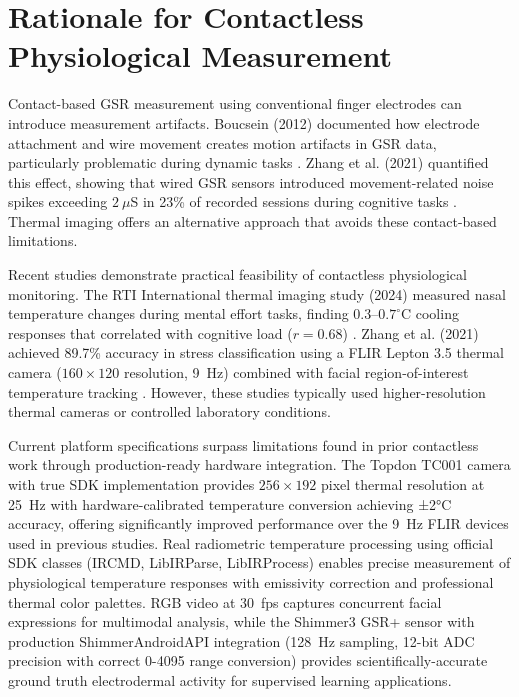 \documentclass{report}
\begin{document}
    \section{Rationale for Contactless Physiological Measurement}
    \label{sec:rationale_contactless}

    Contact-based GSR measurement using conventional finger electrodes can introduce measurement artifacts. Boucsein (2012) documented how electrode attachment and wire movement creates motion artifacts in GSR data, particularly problematic during dynamic tasks \cite{boucsein2012}. Zhang et al. (2021) quantified this effect, showing that wired GSR sensors introduced movement-related noise spikes exceeding $2~\mu$S in 23\% of recorded sessions during cognitive tasks \cite{zhang2021}. Thermal imaging offers an alternative approach that avoids these contact-based limitations.

    Recent studies demonstrate practical feasibility of contactless physiological monitoring. The RTI International thermal imaging study (2024) measured nasal temperature changes during mental effort tasks, finding $0.3$--$0.7^{\circ}$C cooling responses that correlated with cognitive load ($r = 0.68$) \cite{rti2024}. Zhang et al. (2021) achieved 89.7\% accuracy in stress classification using a FLIR Lepton 3.5 thermal camera ($160 \times 120$ resolution, 9~Hz) combined with facial region-of-interest temperature tracking \cite{zhang2021}. However, these studies typically used higher-resolution thermal cameras or controlled laboratory conditions.

    Current platform specifications surpass limitations found in prior contactless work through production-ready hardware integration. The Topdon TC001 camera with true SDK implementation provides $256 \times 192$ pixel thermal resolution at 25~Hz with hardware-calibrated temperature conversion achieving ±2°C accuracy, offering significantly improved performance over the 9~Hz FLIR devices used in previous studies. Real radiometric temperature processing using official SDK classes (IRCMD, LibIRParse, LibIRProcess) enables precise measurement of physiological temperature responses with emissivity correction and professional thermal color palettes. RGB video at 30~fps captures concurrent facial expressions for multimodal analysis, while the Shimmer3 GSR+ sensor with production ShimmerAndroidAPI integration (128~Hz sampling, 12-bit ADC precision with correct 0-4095 range conversion) provides scientifically-accurate ground truth electrodermal activity for supervised learning applications.
\end{document}
